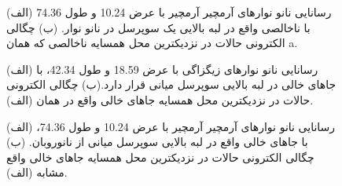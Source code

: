   \begin{figure}[ht]
    \centering
    
    \caption{(الف) رسانایی نانو نوارهای آرمچیر آرمچیر با عرض \lr{\AA} 10.24 و طول \lr{\AA} 74.36 با ناخالصی واقع در لبه بالایی یک سوپرسل در نانو نوار. (ب) چگالی الکترونی حالات در نزدیکترین محل همسایه ناخالصی که همان a.}
    \label{armscatter}
  \end{figure}

\begin{figure}[ht]
    \centering
    
    \caption{(الف) رسانایی نانو نوارهای زیگزاگی با
    عرض \lr{\AA} 18.59 و طول \lr{\AA} 42.34، با جاهای خالی در لبه بالایی سوپرسل ‌میانی قرار دارد.(ب) چگالی الکترونی حالات در نزدیکترین محل همسایه جاهای خالی واقع در همان (الف).}
    \label{zigvacancy}
  \end{figure}
  
\begin{figure}[ht]
\centering

\caption{(الف) رسانایی نانو نوارهای آرمچیر آرمچیر با
عرض \lr{\AA} 10.24 و طول \lr{\AA} 74.36، با جاهای خالی واقع در لبه بالایی سوپرسل ‌میانی از نانوروبان. (ب) چگالی الکترونی حالات در نزدیکترین محل همسایه جاهای خالی واقع مشابه (الف).}
\label{armvacancy}
\end{figure}
